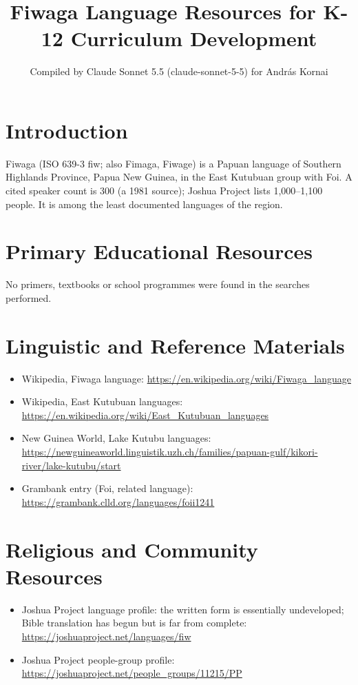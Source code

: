 \documentclass[12pt]{article}
\title{Fiwaga Language Resources for K-12 Curriculum Development}
\author{Compiled by Claude Sonnet 5.5 (claude-sonnet-5-5) for Andr\'as Kornai}
\date{}
\begin{document}
\maketitle

\section{Introduction}
Fiwaga (ISO 639-3 fiw; also Fimaga, Fiwage) is a Papuan language of Southern Highlands Province, Papua New Guinea, in the East Kutubuan group with Foi. A cited speaker count is 300 (a 1981 source); Joshua Project lists 1,000--1,100 people. It is among the least documented languages of the region.

\section{Primary Educational Resources}
No primers, textbooks or school programmes were found in the searches performed.

\section{Linguistic and Reference Materials}
\begin{itemize}
\item Wikipedia, Fiwaga language: \url{https://en.wikipedia.org/wiki/Fiwaga_language}
\item Wikipedia, East Kutubuan languages: \url{https://en.wikipedia.org/wiki/East_Kutubuan_languages}
\item New Guinea World, Lake Kutubu languages: \url{https://newguineaworld.linguistik.uzh.ch/families/papuan-gulf/kikori-river/lake-kutubu/start}
\item Grambank entry (Foi, related language): \url{https://grambank.clld.org/languages/foii1241}
\end{itemize}

\section{Religious and Community Resources}
\begin{itemize}
\item Joshua Project language profile: the written form is essentially undeveloped; Bible translation has begun but is far from complete: \url{https://joshuaproject.net/languages/fiw}
\item Joshua Project people-group profile: \url{https://joshuaproject.net/people_groups/11215/PP}
\end{itemize}
\end{document}
